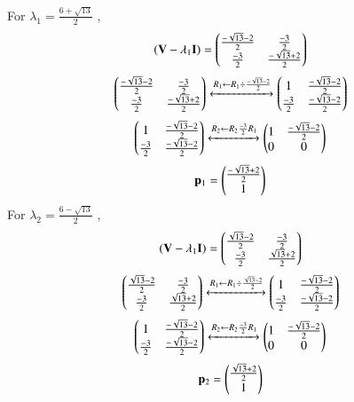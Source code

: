 For $\lambda_1=\frac{6+\sqrt{13}}{2}$ ,
\begin{align}
    (\mathbf{V}-\lambda_1\mathbf{I})=\begin{pmatrix}\frac{-\sqrt{13}-2}{2} & \frac{-3}{2} \\\frac{-3}{2} & \frac{-\sqrt{13}+2}{2}\end{pmatrix}
\end{align}
\begin{align}
   \begin{pmatrix}\frac{-\sqrt{13}-2}{2} & \frac{-3}{2} \\\frac{-3}{2} & \frac{-\sqrt{13}+2}{2}\end{pmatrix}
    \xleftrightarrow[]{R_1 \leftarrow R_1\div\frac{-\sqrt{13}-2}{2}}
    \begin{pmatrix}
    1 &\frac{-\sqrt{13}-2}{2}\\
    \frac{-3}{2} & \frac{-\sqrt{13}-2}{2}
    \end{pmatrix}
\end{align}
\begin{align}
\begin{pmatrix}
    1 &\frac{-\sqrt{13}-2}{2}\\
    \frac{-3}{2} & \frac{-\sqrt{13}-2}{2}
    \end{pmatrix}
    \xleftrightarrow[]{R_2 \leftarrow R_2\frac{-3}{2}R_1}
\begin{pmatrix}
    1 &\frac{-\sqrt{13}-2}{2}\\
    0 &0
    \end{pmatrix}
    \end{align}
    \begin{align}\label{eq:solutions/3/4/2/p_1}
    \mathbf p_1=
    \begin{pmatrix}
    \frac{-\sqrt{13}+2}{2}\\1
    \end{pmatrix}
\end{align}
For $\lambda_2=\frac{6-\sqrt{13}}{2}$ ,
\begin{align}
    (\mathbf{V}-\lambda_1\mathbf{I})=\begin{pmatrix}\frac{\sqrt{13}-2}{2} & \frac{-3}{2} \\\frac{-3}{2} & \frac{\sqrt{13}+2}{2}\end{pmatrix}
\end{align}
\begin{align}
   \begin{pmatrix}\frac{\sqrt{13}-2}{2} & \frac{-3}{2} \\\frac{-3}{2} & \frac{\sqrt{13}+2}{2}\end{pmatrix}
    \xleftrightarrow[]{R_1 \leftarrow R_1\div\frac{\sqrt{13}-2}{2}}
    \begin{pmatrix}
    1 &\frac{-\sqrt{13}-2}{2}\\
    \frac{-3}{2} & \frac{-\sqrt{13}-2}{2}
    \end{pmatrix}
\end{align}
\begin{align}
\begin{pmatrix}
    1 &\frac{-\sqrt{13}-2}{2}\\
    \frac{-3}{2} & \frac{-\sqrt{13}-2}{2}
    \end{pmatrix}
    \xleftrightarrow[]{R_2 \leftarrow R_2\frac{-3}{2}R_1}
\begin{pmatrix}
    1 &\frac{-\sqrt{13}-2}{2}\\
    0 &0
    \end{pmatrix}
    \end{align}
    \begin{align}\label{eq:solutions/3/4/2/p_2}
    \mathbf p_2=
    \begin{pmatrix}
    \frac{\sqrt{13}+2}{2}\\1
    \end{pmatrix}
    \end{align}
